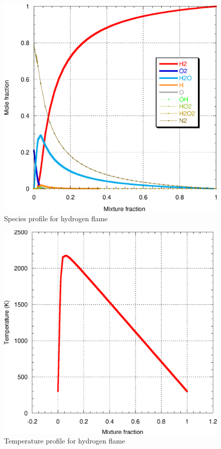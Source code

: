 \begin{figure}[h]
 \centering
\includegraphics[scale=0.6]{flamelet_profile.eps}
\caption{Species profile for hydrogen flame}
\label{flamelet_profile}
\end{figure}

\begin{figure}[h]
 \centering
\includegraphics[scale=0.6]{flamelet_temp.eps}
\caption{Temperature profile for hydrogen flame}
\label{flamelet_temp}
\end{figure}

%
%
%
